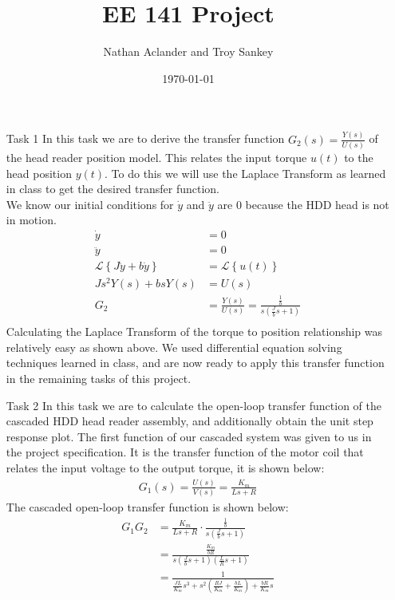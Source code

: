 \documentclass{article}
\title{EE 141 Project}
\date{\today}
\author{Nathan Aclander and Troy Sankey}
\begin{document}
\maketitle
\newpage

\begin{itemize}

\item[Task 1] 
	In this task we are to derive the transfer function $G_2(s) = 
	\frac{Y(s)}{U(s)}$ of the head reader position model. This relates the
	input torque $u(t)$ to the head position $y(t)$. To do this we will use
	the Laplace Transform as learned in class to get the desired transfer 
	function. \\
	We know our initial conditions for $\dot{y}$ and $\ddot{y}$ are $0$ because
	the HDD head is not in motion.
	\begin{align*}
		\dot{y} &= 0 \\
		\ddot{y} &= 0 \\
		\mathcal{L}\left\{ J\ddot{y} + b \dot{y}\right\} &= \mathcal{L}\left\{
		u(t)\right\} \\
		Js^2 Y(s) + bsY(s) &= U(s) \\
		G_2 &= \frac{Y(s)}{U(s)} = \frac{\frac{1}{b}}{s(\frac{J}{b}s + 1)}  \\
	\end{align*}
	Calculating the Laplace Transform of the torque to position relationship
	was relatively easy as shown above. We used differential equation solving
	techniques learned in class, and are now ready to apply this transfer
	function in the remaining tasks of this project.

\item[Task 2]
	In this task we are to calculate the open-loop transfer function of the 
	cascaded HDD head reader assembly, and additionally obtain the unit step
	response plot. 
	The first function of our cascaded system was given to us in the project
	specification. It is the transfer function of the motor coil that relates
	the input voltage to the output torque, it is shown below: \\

	\begin{align*}
		G_1(s) = \frac{U(s)}{V(s)} = \frac{K_m}{Ls + R} 
	\end{align*}
	The cascaded open-loop transfer function is shown below:
	\begin{align*}
		G_1G_2 &= \frac{K_m}{Ls+R} \cdot \frac{\frac{1}{b}}{s(\frac{J}{b}s + 1)} \\
			   &= \frac{\frac{K_m}{bR}}{s\left(\frac{J}{b}s + 1\right)
			   \left(\frac{L}{R}s + 1\right)} \\
			   &= \frac{1}{\frac{JL}{K_m}s^3 + s^2\left( \frac{RJ}{K_m} + 
			   \frac{bL}{K_m} \right) + \frac{bR}{K_m}s}
	\end{align*}


\end{itemize}
\end{document}
